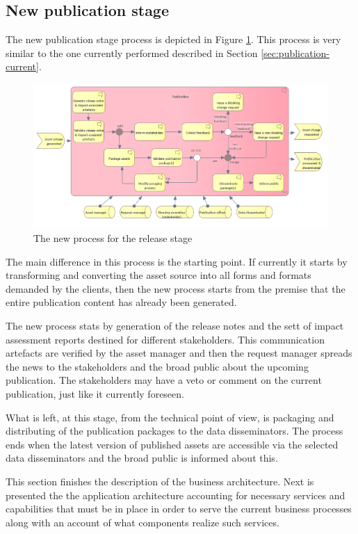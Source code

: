 	\subsection{New publication stage}
	\label{sec:publication-new}
	
	The new publication stage process is depicted in Figure \ref{fig:publication-new}. This process is very similar to the one currently performed described in Section \ref{sec:publication-current}.
	
	\begin{figure}[h]
		\centering
		\includegraphics[width=1.05\textwidth]{images/business/new/Publication.png}
		\caption{The new process for the release stage}
		\label{fig:publication-new}
	\end{figure}

	The main difference in this process is the starting point. If currently it starts by transforming and converting the asset source into all forms and formats demanded by the clients, then the new process starts from the premise that the entire publication content has already been generated. 
	
	The new process stats by generation of the release notes and the sett of impact assessment reports destined for different stakeholders. This communication artefacts are verified by the asset manager and then the request manager spreads the news to the stakeholders and the broad public about the upcoming publication. The stakeholders may have a veto or comment on the current publication, just like it currently foreseen.   
	
	What is left, at this stage, from the technical point of view, is packaging and distributing of the publication packages to the data disseminators. The process ends when the latest version of published assets are accessible via the selected data disseminators and the broad public is informed about this. 
	
	This section finishes the description of the business architecture. Next is presented the the application architecture accounting for necessary services and capabilities that must be in place in order to serve the current business processes along with an account of what components realize such services. 
	
